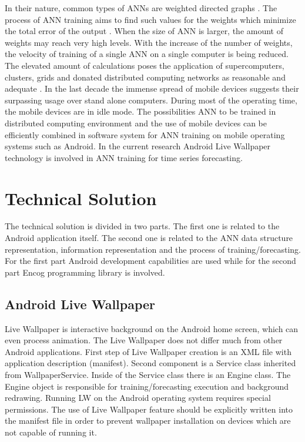 \documentclass{llncs}
\begin{document}
In their nature, common types of ANNs are weighted directed graphs \cite{balabanov03}. The process of ANN training aims to find such values for the weights which minimize the total error of the output \cite{balabanov04}. When the size of ANN is larger, the amount of weights may reach very high levels. With the increase of the number of weights, the velocity of training of a single ANN on a single computer is being reduced. The elevated amount of calculations poses the application of supercomputers, clusters, grids and donated distributed computing networks as reasonable and adequate \cite{balabanov01,balabanov02,keremedchiev01,tomov01}. In the last decade the immense spread of mobile devices suggests their surpassing usage over stand alone computers. During most of the operating time, the mobile devices are in idle mode. The possibilities ANN to be trained in distributed computing environment and the use of mobile devices can be efficiently combined in software system for ANN training on mobile operating systems such as Android. In the current research Android Live Wallpaper technology is involved in ANN training for time series forecasting.

\section{Technical Solution}

The technical solution is divided in two parts. The first one is related to the Android application itself. The second one is related to the ANN data structure representation, information representation and the process of training/forecasting. For the first part Android development capabilities are used while for the second part Encog programming library is involved. 

\subsection{Android Live Wallpaper}

Live Wallpaper is interactive background on the Android home screen, which can even process animation. The Live Wallpaper does not differ much from other Android applications. First step of Live Wallpaper creation is an XML file with application description (manifest). Second component is a Service class inherited from WallpaperService. Inside of the Service class there is an Engine class. The Engine object is responsible for training/forecasting execution and background redrawing. Running LW on the Android operating system requires special permissions. The use of Live Wallpaper feature should be explicitly written into the manifest file in order to prevent wallpaper installation on devices which are not capable of running it. 
\end{document}
